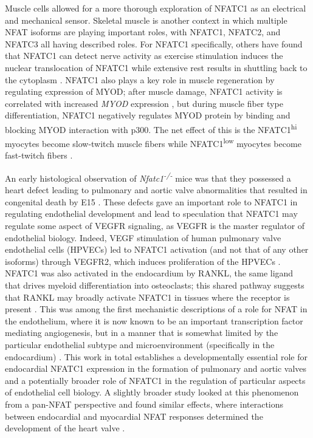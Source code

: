 Muscle cells allowed for a more thorough exploration of NFATC1 as an electrical and mechanical sensor. Skeletal muscle is another context in which multiple NFAT isoforms are playing important roles, with NFATC1, NFATC2, and NFATC3 all having described roles. For NFATC1 specifically, others have found that NFATC1 can detect nerve activity as exercise stimulation induces the nuclear translocation of NFATC1 while extensive rest results in shuttling back to the cytoplasm \citep{Tothova2006}. NFATC1 also plays a key role in muscle regeneration by regulating expression of MYOD; after muscle damage, NFATC1 activity is correlated with increased \textit{MYOD} expression \citep{Sakuma2003}, but during muscle fiber type differentiation, NFATC1 negatively regulates MYOD protein by binding and blocking MYOD interaction with p300. The net effect of this is the NFATC1\textsuperscript{hi} myocytes become slow\hyp{}twitch muscle fibers while NFATC1\textsuperscript{low} myocytes become fast\hyp{}twitch fibers \citep{Ehlers2014}. 

An early histological observation of \textit{Nfatc1\textsuperscript{\hyp{}/\hyp{}}} mice was that they possessed a heart defect leading to pulmonary and aortic valve abnormalities that resulted in congenital death by E15 \citep{delaPompa1998, Ranger1998b}. These defects gave an important role to NFATC1 in regulating endothelial development and lead to speculation that NFATC1 may regulate some aspect of VEGFR signaling, as VEGFR is the master regulator of endothelial biology. Indeed, VEGF stimulation of human pulmonary valve endothelial cells (HPVECs) led to NFATC1 activation (and not that of any other isoforms) through VEGFR2, which induces proliferation of the HPVECs \citep{Johnson2003}. NFATC1 was also activated in the endocardium by RANKL, the same ligand that drives myeloid differentiation into osteoclasts; this shared pathway suggests that RANKL may broadly activate NFATC1 in tissues where the receptor is present \citep{Combs2009}. This was among the first mechanistic descriptions of a role for NFAT in the endothelium, where it is now known to be an important transcription factor mediating angiogenesis, but in a manner that is somewhat limited by the particular endothelial subtype and microenvironment (specifically in the endocardium) \citep{Jang2010, Wu2012, Wu2013, Gunawan2020, Courtwright2009}. This work in total establishes a developmentally essential role for endocardial NFATC1 expression in the formation of pulmonary and aortic valves and a potentially broader role of NFATC1 in the regulation of particular aspects of endothelial cell biology. A slightly broader study looked at this phenomenon from a pan\hyp{}NFAT perspective and found similar effects, where interactions between endocardial and myocardial NFAT responses determined the development of the heart valve \citep{Chang2004}.

